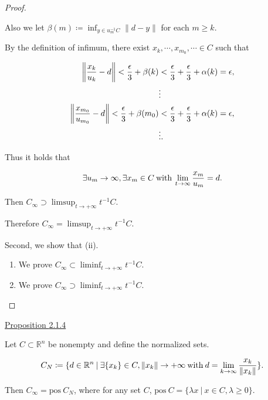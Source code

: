 \documentclass[a4paper,11pt]{jsarticle}
\newcommand{\PROPOSITION}[2]{\begin{itembox}[l]{\underline{Proposition {#1} }}{#2}\end{itembox}}
\newcommand{\NDemenstionalRealEuclidianSpace}{\mathbb{R}^n}
\begin{document}
\begin{proof}
\begin{enumerate}[label=i-\alph*,align=CenterWithParen]
      Also we let $\beta(m) \coloneqq \inf_{y \in u_m^{-1}C} \left\lVert d - y \right\rVert$ for each $m \geq k$.

      By the definition of infimum, there exist $x_k, \cdots, x_{m_0}, \cdots \in C$ such that

      \begin{equation}
        \begin{split}
          \left\lVert \frac{x_k}{u_k} - d \right\rVert  < \frac{\epsilon}{3} + \beta(k) &< \frac{\epsilon}{3} + \frac{\epsilon}{3} + \alpha(k) = \epsilon, \\
          &\vdots  \\
          \left\lVert \frac{x_{m_0}}{u_{m_0}} - d \right\rVert  < \frac{\epsilon}{3} + \beta(m_0) &< \frac{\epsilon}{3} + \frac{\epsilon}{3} + \alpha(k) = \epsilon, \\
          &\vdots. \notag
        \end{split}
      \end{equation}

      Thus it holds that

      \begin{equation}
        \exists u_m \to \infty, \exists x_m \in C \:\text{with}\: \lim_{t \to \infty} \frac{x_m}{u_m} = d. \notag
      \end{equation}

      Then $C_{\infty} \supset \limsup_{t \to + \infty} t^{-1}C$.

  \end{enumerate}

  Therefore $C_{\infty} = \limsup_{t \to + \infty} t^{-1}C$.

  Second, we show that (ii).

  \begin{enumerate}[label=ii-\alph*,align=CenterWithParen2]
    \item We prove $C_{\infty} \subset \liminf_{t \to + \infty} t^{-1}C$.


    \item We prove $C_{\infty} \supset \liminf_{t \to + \infty} t^{-1}C$.


  \end{enumerate}
\end{proof}

\PROPOSITION{2.1.4}{
  Let $C \subset \NDemenstionalRealEuclidianSpace$ be nonempty and define the normalized sets.

  \begin{equation}
    C_N \coloneqq \{d \in \NDemenstionalRealEuclidianSpace \:|\: \exists \{x_k\} \in C, \left\lVert x_k \right\rVert \rightarrow +\infty \:\text{with}\: d = \lim_{k \to \infty} \frac{x_k}{\left\lVert x_k \right\rVert }\}. \notag
  \end{equation}

  Then $C_{\infty} = \text{pos}\:C_N$, where for any set $C$, $\text{pos}\:C = \{\lambda x \:|\: x \in C, \lambda \geq 0\}$.
}
\end{document}
